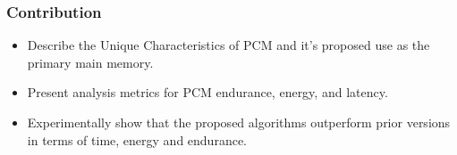 \begin{frame}
\frametitle{Contribution}

\begin{itemize}
\item Describe the Unique Characteristics of PCM and it's proposed use as the primary main memory.
\item Present analysis metrics for PCM endurance, energy, and latency.
\item Experimentally show that the proposed algorithms outperform prior versions in terms of time, energy and endurance.
\end{itemize}

\end{frame}